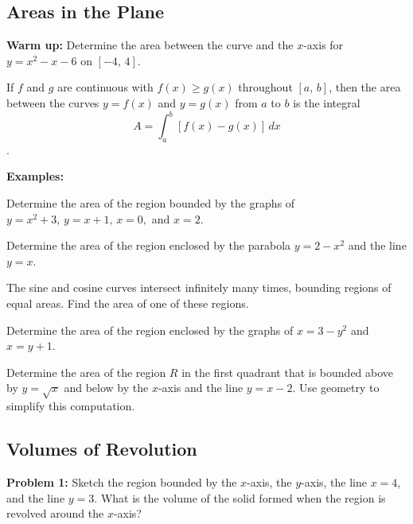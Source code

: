 \documentclass[addpoints, 12pt]{exam}
\begin{document}
\newpage
{}
\subsection*{Areas in the Plane}
\textbf{Warm up:} Determine the area between the curve and the $x$-axis for $y=x^2-x-6$ on $[-4,\,4].$

\begin{tcolorbox}[title= AREA IN THE PLANE,colframe=black,sharp corners,colback=white,colbacktitle=white,coltitle=black,boxrule=1pt]

     If $f$ and $g$ are continuous with $f(x)\ge g(x)$ throughout $[a,\,b]$, then the area between the curves $y=f(x)$ and $y=g(x)$ from $a$ to $b$ is the integral
     \[A=\int_a^b\left[f(x)-g(x)\right]\,dx\].
    
\end{tcolorbox}

\textbf{Examples:}
\begin{questions}
    \question Determine the area of the region bounded by the graphs of $y=x^2+3,\,y=x+1,\,x=0,$ and $x=2$.
    
    \question Determine the area of the region enclosed by the parabola $y=2-x^2$ and the line $y=x$.
    
    \newpage
    
    \question The sine and cosine curves intersect infinitely many times, bounding regions of equal areas. Find the area of one of these regions.
    
    \question Determine the area of the region enclosed by the graphs of $x=3-y^2$ and $x=y+1$.
    
    \question Determine the area of the region $R$ in the first quadrant that is bounded above by $y=\sqrt{x}$ and below by the $x$-axis and the line $y=x-2$. Use geometry to simplify this computation.
\end{questions}



\newpage
{}
\subsection*{Volumes of Revolution}
\textbf{Problem 1:} Sketch the region bounded by the $x$-axis, the $y$-axis, the line $x=4$, and the line $y=3$. What is the volume of the solid formed when the region is revolved around the $x$-axis?
\end{document}
